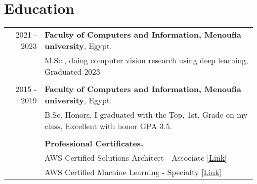 \documentclass[a4paper,10pt]{article}
\begin{document}
\section{\textbf{Education}}
\begin{tabular}{r|l}
    2021 - 2023  & \textbf{Faculty of Computers and Information, Menoufia university}, Egypt.\\ & M.Sc., doing computer vision research using deep learning, Graduated 2023 \\
    &\\
    2015 - 2019 & \textbf{Faculty of Computers and Information, Menoufia university}, Egypt. \\ & B.Sc. Honors, I graduated with the Top, 1st, Grade on my class, Excellent with honor GPA 3.5. \\
    &\\
    & \textbf{Professional Certificates.} \\
    & AWS Certified Solutions Architect - Associate [\href{https://cp.certmetrics.com/amazon/en/public/verify/credential/8ff7ef944a1c49cf873b541903d9cbc3}{Link}] \\
    & AWS Certified Machine Learning - Specialty [\href{https://cp.certmetrics.com/amazon/en/public/verify/credential/b5b06f594c0a45929e1971bf5215daf7}{Link}] \\
    \end{tabular}


\end{document}
